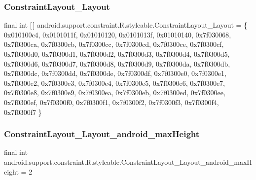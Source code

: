 \subsubsection{\texorpdfstring{Constraint\+Layout\+\_\+\+Layout}{ConstraintLayout\_Layout}}
{\footnotesize\ttfamily final int \mbox{[}$\,$\mbox{]} android.\+support.\+constraint.\+R.\+styleable.\+Constraint\+Layout\+\_\+\+Layout = \{ 0x010100c4, 0x0101011f, 0x01010120, 0x0101013f, 0x01010140, 0x7f030068, 0x7f0300ca, 0x7f0300cb, 0x7f0300cc, 0x7f0300cd, 0x7f0300ce, 0x7f0300cf, 0x7f0300d0, 0x7f0300d1, 0x7f0300d2, 0x7f0300d3, 0x7f0300d4, 0x7f0300d5, 0x7f0300d6, 0x7f0300d7, 0x7f0300d8, 0x7f0300d9, 0x7f0300da, 0x7f0300db, 0x7f0300dc, 0x7f0300dd, 0x7f0300de, 0x7f0300df, 0x7f0300e0, 0x7f0300e1, 0x7f0300e2, 0x7f0300e3, 0x7f0300e4, 0x7f0300e5, 0x7f0300e6, 0x7f0300e7, 0x7f0300e8, 0x7f0300e9, 0x7f0300ea, 0x7f0300eb, 0x7f0300ed, 0x7f0300ee, 0x7f0300ef, 0x7f0300f0, 0x7f0300f1, 0x7f0300f2, 0x7f0300f3, 0x7f0300f4, 0x7f0300f7 \}\hspace{0.3cm}{\ttfamily [static]}}

\mbox{\label{classandroid_1_1support_1_1constraint_1_1R_1_1styleable_adf760fb5ee1563b2ba152b3fb0a72f81}} 
\subsubsection{\texorpdfstring{Constraint\+Layout\+\_\+\+Layout\+\_\+android\+\_\+max\+Height}{ConstraintLayout\_Layout\_android\_maxHeight}}
{\footnotesize\ttfamily final int android.\+support.\+constraint.\+R.\+styleable.\+Constraint\+Layout\+\_\+\+Layout\+\_\+android\+\_\+max\+Height = 2\hspace{0.3cm}{\ttfamily [static]}}

\mbox{\label{classandroid_1_1support_1_1constraint_1_1R_1_1styleable_a325d89e861b9f5497a3232f571c40ec4}} 
